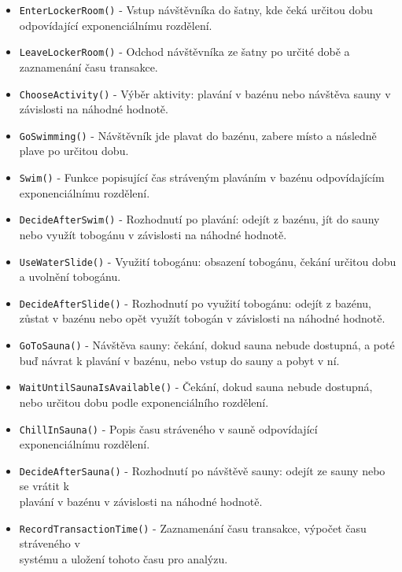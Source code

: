 \documentclass[a4paper, 11pt]{article}
\begin{document}
    \begin{itemize}
    \item \verb|EnterLockerRoom()| - Vstup návštěvníka do šatny, kde čeká určitou dobu odpovídající exponenciálnímu rozdělení.
    \item \verb|LeaveLockerRoom()| - Odchod návštěvníka ze šatny po určité době a zaznamenání času transakce.

    \item \verb|ChooseActivity()| - Výběr aktivity: plavání v bazénu nebo návštěva sauny v závislosti na náhodné hodnotě.
    
    \item \verb|GoSwimming()| - Návštěvník jde plavat do bazénu, zabere místo a následně plave po určitou dobu.
    
    \item \verb|Swim()| - Funkce popisující čas stráveným plaváním v bazénu odpovídajícím exponenciálnímu rozdělení.
    
    \item \verb|DecideAfterSwim()| - Rozhodnutí po plavání: odejít z bazénu, jít do sauny nebo využít tobogánu v závislosti na náhodné hodnotě.
    
    \item \verb|UseWaterSlide()| - Využití tobogánu: obsazení tobogánu, čekání určitou dobu a uvolnění tobogánu.
    
    \item \verb|DecideAfterSlide()| - Rozhodnutí po využití tobogánu: odejít z bazénu, zůstat v bazénu nebo opět využít tobogán v závislosti na náhodné hodnotě.
    
    \item \verb|GoToSauna()| - Návštěva sauny: čekání, dokud sauna nebude dostupná, a poté buď návrat k plavání v bazénu, nebo vstup do sauny a pobyt v ní.
    
    \item \verb|WaitUntilSaunaIsAvailable()| - Čekání, dokud sauna nebude dostupná, nebo určitou dobu podle exponenciálního rozdělení.
    
    \item \verb|ChillInSauna()| - Popis času stráveného v sauně odpovídající exponenciálnímu rozdělení.
    
    \item \verb|DecideAfterSauna()| - Rozhodnutí po návštěvě sauny: odejít ze sauny nebo se vrátit k \\ plavání v bazénu v závislosti na náhodné hodnotě.
    
    \item \verb|RecordTransactionTime()| - Zaznamenání času transakce, výpočet času stráveného v \\ systému a uložení tohoto času pro analýzu.
    \end{itemize}
\end{document}
